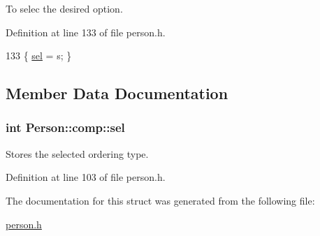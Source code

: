 To selec the desired option. 



Definition at line 133 of file person.\+h.


\begin{DoxyCode}
133 \{ \hyperlink{struct_person_1_1comp_a85555416f9f001302f50825aa149ced3}{sel} = s; \}
\end{DoxyCode}


\subsection{Member Data Documentation}
\hypertarget{struct_person_1_1comp_a85555416f9f001302f50825aa149ced3}{
\subsubsection[{sel}]{\setlength{\rightskip}{0pt plus 5cm}int Person\+::comp\+::sel}}\label{struct_person_1_1comp_a85555416f9f001302f50825aa149ced3}


Stores the selected ordering type. 



Definition at line 103 of file person.\+h.



The documentation for this struct was generated from the following file\+:\begin{DoxyCompactItemize}
\item 
\hyperlink{person_8h}{person.\+h}\end{DoxyCompactItemize}
